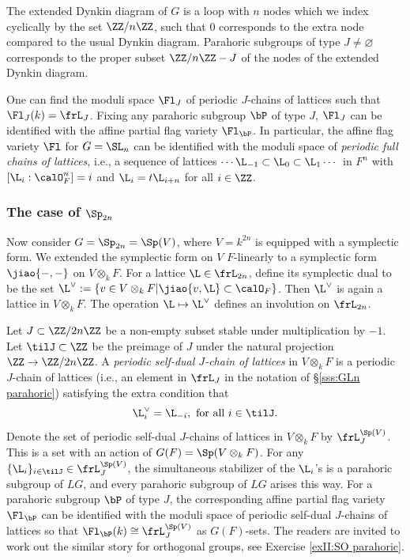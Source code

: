The extended Dynkin diagram of $G$ is a loop with $n$ nodes which we index cyclically by the set $\ZZ/n\ZZ$, such that $0$ corresponds to the extra node compared to the usual Dynkin diagram. Parahoric subgroups of type $J\neq\varnothing$ corresponds to the proper subset $\ZZ/n\ZZ-J$ of the nodes of the extended Dynkin diagram.
 
One can find the moduli space $\Fl_{J}$ of periodic $J$-chains of lattices such that  $\Fl_{J}(k)=\frL_{J}$. Fixing any parahoric subgroup $\bP$ of type $J$, $\Fl_{J}$ can be identified with the affine partial flag variety $\Fl_{\bP}$.  In particular, the affine flag variety $\Fl$ for $G=\SL_{n}$ can be identified with the moduli space of {\em periodic full chains of lattices}, i.e., a sequence of lattices $\cdots \L_{-1}\subset \L_{0}\subset \L_{1}\cdots$ in $F^{n}$ with $[\L_{i}:\calO^{n}_{F}]=i$ and $\L_{i}=t\L_{i+n}$ for all $i\in\ZZ$.



\subsubsection{The case of $\Sp_{2n}$}\label{sss:Sp parahoric} Now consider $G=\Sp_{2n}=\Sp(V)$, where $V=k^{2n}$ is equipped with a symplectic form. We extended the symplectic form on $V$ $F$-linearly to a symplectic form $\jiao{-,-}$ on $V\otimes_{k}F$. For a lattice $\L\in \frL_{2n}$,  define its symplectic dual to be the set $\L^{\vee}:=\{v\in V\otimes_{k}F|\jiao{v,\L}\subset \calO_{F}\}$. Then $\L^{\vee}$ is again a lattice in $V\otimes_{k}F$. The operation $\L\mapsto \L^{\vee}$ defines an involution on $\frL_{2n}$.  

Let $J\subset\ZZ/2n\ZZ$ be a non-empty subset stable under multiplication by $-1$. Let $\tilJ\subset \ZZ$ be the preimage of $J$ under the natural projection $\ZZ\to\ZZ/2n\ZZ$. A {\em periodic self-dual $J$-chain of lattices} in $V\otimes_{k}F$ is a periodic $J$-chain of lattices (i.e., an element in $\frL_{J}$ in the notation of \S\ref{sss:GLn parahoric}) satisfying the extra condition that
\begin{equation*}
\L^{\vee}_{i}=\L_{-i}, \textup{ for all } i\in \tilJ.
\end{equation*}
Denote the set of periodic self-dual $J$-chains of lattices in $V\otimes_{k}F$ by $\frL^{\Sp(V)}_{J}$. This is a set with an action of $G(F)=\Sp(V\otimes_{k}F)$. For any $\{\L_{i}\}_{i\in\tilJ}\in \frL^{\Sp(V)}_{J}$, the simultaneous stabilizer of the $\L_{i}$'s is a parahoric subgroup of $LG$, and every parahoric subgroup of $LG$ arises this way. For a parahoric subgroup $\bP$ of type $J$, the corresponding affine partial flag variety $\Fl_{\bP}$ can be identified with the moduli space of periodic self-dual $J$-chains of lattices so that $\Fl_{\bP}(k)\cong\frL^{\Sp(V)}_{J}$ as $G(F)$-sets. The readers are invited to work out the similar story for orthogonal groups, see Exercise \ref{exII:SO parahoric}.





